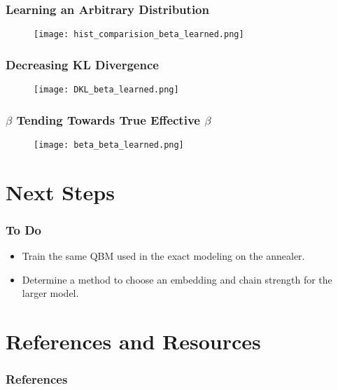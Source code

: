 \documentclass{beamer}
\begin{document}
\begin{frame}
    \frametitle{Learning an Arbitrary Distribution}
    \begin{figure}
        \texttt{[image: hist\_comparision\_beta\_learned.png]}
    \end{figure}
\end{frame}

\begin{frame}
    \frametitle{Decreasing KL Divergence}
    \begin{figure}
        \texttt{[image: DKL\_beta\_learned.png]}
    \end{figure}
\end{frame}

\begin{frame}
    \frametitle{\( \beta \) Tending Towards True Effective \( \beta \)}
    \begin{figure}
        \texttt{[image: beta\_beta\_learned.png]}
    \end{figure}
\end{frame}



\section{Next Steps}

\begin{frame}
    \frametitle{To Do}
    \begin{itemize}
        \item Train the same QBM used in the exact modeling on the annealer.
        \item Determine a method to choose an embedding and chain strength for the larger model.
    \end{itemize}
\end{frame}


\section{References and Resources}

\begin{frame}[allowframebreaks]
    \frametitle{References}
    \footnotesize{
        
        
    }
\end{frame}
\end{document}
